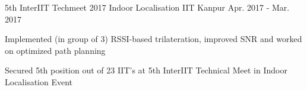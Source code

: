\begin{cventries}
  \cventry
    {5th InterIIT Techmeet 2017} %
    {Indoor Localisation} %
    {IIT Kanpur} %
    {Apr. 2017 - Mar. 2017} %
    {
      \begin{cvitems} %
        \item {Implemented (in group of 3) RSSI-based trilateration, improved SNR  and worked on optimized path planning}
        \item {Secured 5th position out of 23 IIT's at 5th InterIIT Technical Meet in Indoor Localisation Event}
      \end{cvitems}
    }
      


\end{cventries}



